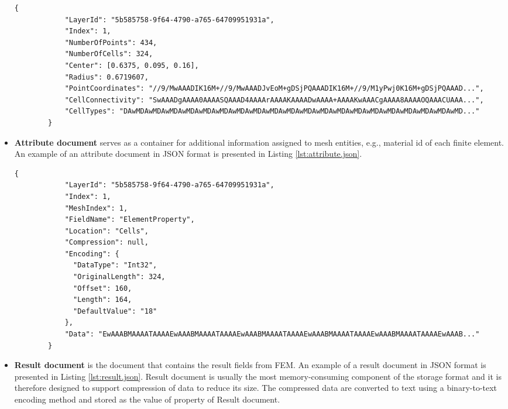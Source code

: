 \begin{itemize}
    \begin{lstlisting}[style=json,caption=Example of mesh.json document.,label=lst:mesh.json]
        {
            "LayerId": "5b585758-9f64-4790-a765-64709951931a",
            "Index": 1,
            "NumberOfPoints": 434,
            "NumberOfCells": 324,
            "Center": [0.6375, 0.095, 0.16],
            "Radius": 0.6719607,
            "PointCoordinates": "//9/MwAAADIK16M+//9/MwAAADJvEoM+gDSjPQAAADIK16M+//9/M1yPwj0K16M+gDSjPQAAAD...",
            "CellConnectivity": "SwAAADgAAAA0AAAASQAAAD4AAAArAAAAKAAAADwAAAA+AAAAKwAAACgAAAA8AAAAOQAAACUAAA...",
            "CellTypes": "DAwMDAwMDAwMDAwMDAwMDAwMDAwMDAwMDAwMDAwMDAwMDAwMDAwMDAwMDAwMDAwMDAwMDAwMDAwMDAwMD..."
        }
        \end{lstlisting}

    \item \textbf{Attribute document} serves as a container for additional information assigned to mesh entities, e.g., material id of each finite element. An example of an attribute document in JSON format is presented in Listing \ref{lst:attribute.json}.

    \begin{lstlisting}[style=json,caption=Example of attribute.json document.,label=lst:attribute.json]
        {
            "LayerId": "5b585758-9f64-4790-a765-64709951931a",
            "Index": 1,
            "MeshIndex": 1,
            "FieldName": "ElementProperty",
            "Location": "Cells",
            "Compression": null,
            "Encoding": {
              "DataType": "Int32",
              "OriginalLength": 324,
              "Offset": 160,
              "Length": 164,
              "DefaultValue": "18"
            },
            "Data": "EwAAABMAAAATAAAAEwAAABMAAAATAAAAEwAAABMAAAATAAAAEwAAABMAAAATAAAAEwAAABMAAAATAAAAEwAAAB..."
        }
        \end{lstlisting}

    \item \textbf{Result document} is the document that contains the result fields from FEM. An example of a result document in JSON format is presented in Listing \ref{lst:result.json}. Result document is usually the most memory-consuming component of the storage format and it is therefore designed to support compression of data to reduce its size. The compressed data are converted to text using a binary-to-text encoding method and stored as the value of  property of Result document.



\end{itemize}
